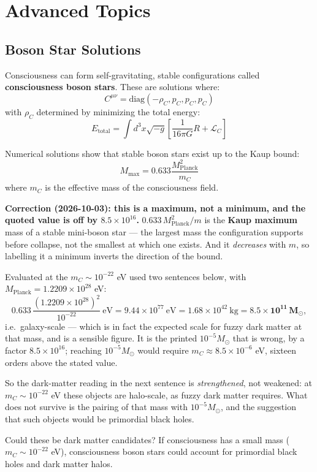 \section{Advanced Topics}

\begin{advanced}
\subsection{Boson Star Solutions}

Consciousness can form self-gravitating, stable configurations called \textbf{consciousness boson stars}. These are solutions where:
\begin{equation}
C^{\mu\nu} = \text{diag}(-\rho_C, p_C, p_C, p_C)
\end{equation}
with $\rho_C$ determined by minimizing the total energy:
\begin{equation}
E_{\text{total}} = \int d^3x \sqrt{-g} \left[ \frac{1}{16\pi G}R + \mathcal{L}_C \right]
\end{equation}

Numerical solutions show that stable boson stars exist up to the Kaup bound:
\begin{equation}
M_{\text{max}} = 0.633 \frac{M_{\text{Planck}}^2}{m_C}
\end{equation}
where $m_C$ is the effective mass of the consciousness field.

\medskip
\noindent\textbf{Correction (2026-10-03): this is a maximum, not a minimum, and
the quoted value is off by $8.5\times10^{16}$.}
$0.633\,M_{\text{Planck}}^2/m$ is the \textbf{Kaup maximum} mass of a stable
mini-boson star --- the largest mass the configuration supports before collapse,
not the smallest at which one exists. And it \emph{decreases} with $m$, so
labelling it a minimum inverts the direction of the bound.

Evaluated at the $m_C \sim 10^{-22}$ eV used two sentences below, with
$M_{\text{Planck}} = 1.2209\times10^{28}$ eV:
\[
0.633\,\frac{(1.2209\times10^{28})^2}{10^{-22}}\ \mathrm{eV}
= 9.44\times10^{77}\ \mathrm{eV} = 1.68\times10^{42}\ \mathrm{kg}
= \mathbf{8.5\times10^{11}\,M_\odot},
\]
i.e.\ galaxy-scale --- which is in fact the expected scale for fuzzy dark matter
at that mass, and is a sensible figure. It is the printed $10^{-5}M_\odot$ that is
wrong, by a factor $8.5\times10^{16}$; reaching $10^{-5}M_\odot$ would require
$m_C \approx 8.5\times10^{-6}$ eV, sixteen orders above the stated value.

So the dark-matter reading in the next sentence is \emph{strengthened}, not
weakened: at $m_C \sim 10^{-22}$ eV these objects are halo-scale, as fuzzy dark
matter requires. What does not survive is the pairing of that mass with
$10^{-5}M_\odot$, and the suggestion that such objects would be primordial
black holes.

Could these be dark matter candidates? If consciousness has a small mass ($m_C \sim 10^{-22}$ eV), consciousness boson stars could account for primordial black holes and dark matter halos.
\end{advanced}

